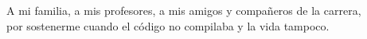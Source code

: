 \begin{dedication}
    A mi familia, a mis profesores, a mis amigos y compañeros de la carrera, \\
    por sostenerme cuando el código no compilaba y la vida tampoco.
\end{dedication}
